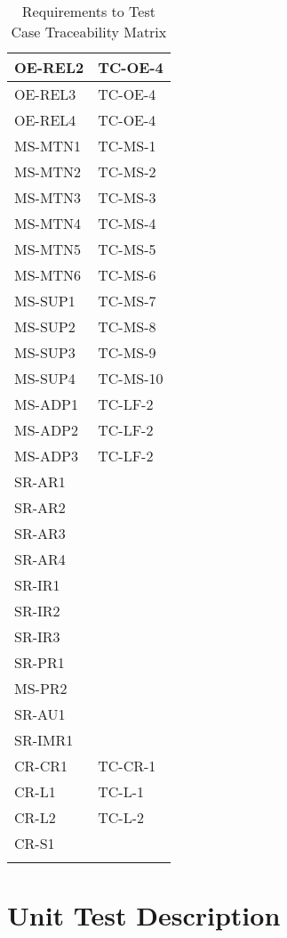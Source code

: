 \documentclass[12pt, titlepage]{article}
\begin{document}
\begin{enumerate}
\begin{longtable}{|l|l|}
      OE-REL2 & TC-OE-4 \\ \hline
      OE-REL3 & TC-OE-4 \\ \hline
      OE-REL4 & TC-OE-4 \\ \hline
      MS-MTN1 & TC-MS-1 \\ \hline
      MS-MTN2 & TC-MS-2 \\ \hline
      MS-MTN3 & TC-MS-3 \\ \hline
      MS-MTN4 & TC-MS-4 \\ \hline
      MS-MTN5 & TC-MS-5 \\ \hline
      MS-MTN6 & TC-MS-6 \\ \hline
      MS-SUP1 & TC-MS-7 \\ \hline
      MS-SUP2 & TC-MS-8 \\ \hline
      MS-SUP3 & TC-MS-9 \\ \hline
      MS-SUP4 & TC-MS-10 \\ \hline
      MS-ADP1 & TC-LF-2 \\ \hline
      MS-ADP2 & TC-LF-2 \\ \hline
      MS-ADP3 & TC-LF-2 \\ \hline
      SR-AR1 & \\ \hline
      SR-AR2 & \\ \hline
      SR-AR3 & \\ \hline
      SR-AR4 & \\ \hline
      SR-IR1 & \\ \hline
      SR-IR2 & \\ \hline
      SR-IR3 & \\ \hline
      SR-PR1 & \\ \hline
      MS-PR2 & \\ \hline
      SR-AU1 & \\ \hline
      SR-IMR1 & \\ \hline
      CR-CR1 & TC-CR-1 \\ \hline
      CR-L1 & TC-L-1 \\ \hline
      CR-L2 & TC-L-2 \\ \hline
      CR-S1 & \\ \hline
      \caption{Requirements to Test Case Traceability Matrix}
    \end{longtable}

    \section{Unit Test Description}



\end{enumerate}
\end{document}
